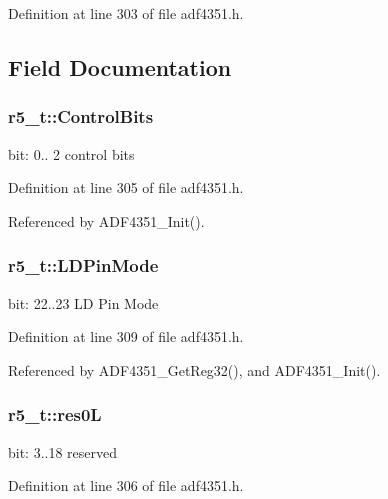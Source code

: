 Definition at line 303 of file adf4351.\+h.



\subsection{Field Documentation}
\subsubsection[{\texorpdfstring{Control\+Bits}{ControlBits}}]{ r5\+\_\+t\+::\+Control\+Bits}\hypertarget{structr5__t_aa71c458a3167da85d477b00cf0ae346a}{}\label{structr5__t_aa71c458a3167da85d477b00cf0ae346a}
bit\+: 0.. 2 control bits 

Definition at line 305 of file adf4351.\+h.



Referenced by A\+D\+F4351\+\_\+\+Init().

\subsubsection[{\texorpdfstring{L\+D\+Pin\+Mode}{LDPinMode}}]{ r5\+\_\+t\+::\+L\+D\+Pin\+Mode}\hypertarget{structr5__t_a55135418b639eabcc007205a689dd828}{}\label{structr5__t_a55135418b639eabcc007205a689dd828}
bit\+: 22..23 LD Pin Mode 

Definition at line 309 of file adf4351.\+h.



Referenced by A\+D\+F4351\+\_\+\+Get\+Reg32(), and A\+D\+F4351\+\_\+\+Init().

\subsubsection[{\texorpdfstring{res0L}{res0L}}]{ r5\+\_\+t\+::res0L}\hypertarget{structr5__t_ac295706ea60257469bdd2074f7ec3197}{}\label{structr5__t_ac295706ea60257469bdd2074f7ec3197}
bit\+: 3..18 reserved 

Definition at line 306 of file adf4351.\+h.



